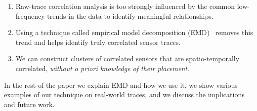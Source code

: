 \begin{enumerate}
\item Raw-trace correlation analysis is too strongly influenced by the common low-frequency trends in the data
	to identify meaningful relationships.
\item Using a technique called empirical model decomposition (EMD)~\cite{huang:emd1998} removes this 
		 trend and helps identify truly correlated sensor traces.
\item We can construct clusters of correlated sensors that are spatio-temporally correlated, \emph{without
		a priori knowledge of their placement}.
\end{enumerate}

In the rest of the paper we explain EMD and how we use it, we show various examples of our technique on real-world
traces, and we discuss the implications and future work.










